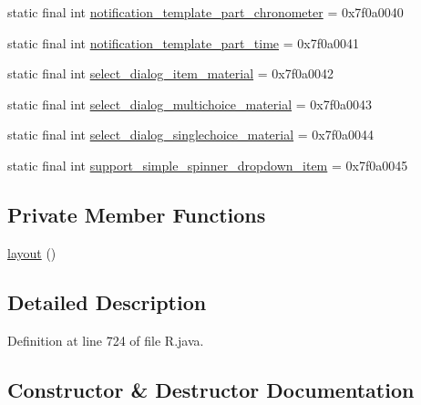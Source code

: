 \begin{DoxyCompactItemize}
\item 
static final int \mbox{\hyperlink{classandroid_1_1support_1_1v7_1_1appcompat_1_1_r_1_1layout_a40ec1f0c58d5ef14dcdabd2917b39098}{notification\+\_\+template\+\_\+part\+\_\+chronometer}} = 0x7f0a0040
\item 
static final int \mbox{\hyperlink{classandroid_1_1support_1_1v7_1_1appcompat_1_1_r_1_1layout_a45b077fa0a865191a582090d784b1163}{notification\+\_\+template\+\_\+part\+\_\+time}} = 0x7f0a0041
\item 
static final int \mbox{\hyperlink{classandroid_1_1support_1_1v7_1_1appcompat_1_1_r_1_1layout_ac19040d9099a5f9d5427814ac4a16e37}{select\+\_\+dialog\+\_\+item\+\_\+material}} = 0x7f0a0042
\item 
static final int \mbox{\hyperlink{classandroid_1_1support_1_1v7_1_1appcompat_1_1_r_1_1layout_adaf8230a8b0f528256d97c8817a7ea3c}{select\+\_\+dialog\+\_\+multichoice\+\_\+material}} = 0x7f0a0043
\item 
static final int \mbox{\hyperlink{classandroid_1_1support_1_1v7_1_1appcompat_1_1_r_1_1layout_a5310ca432c171907a158a12388549c4b}{select\+\_\+dialog\+\_\+singlechoice\+\_\+material}} = 0x7f0a0044
\item 
static final int \mbox{\hyperlink{classandroid_1_1support_1_1v7_1_1appcompat_1_1_r_1_1layout_ad5f037f06366e908921922a2df0a8133}{support\+\_\+simple\+\_\+spinner\+\_\+dropdown\+\_\+item}} = 0x7f0a0045
\end{DoxyCompactItemize}
\subsection*{Private Member Functions}
\begin{DoxyCompactItemize}
\item 
\mbox{\hyperlink{classandroid_1_1support_1_1v7_1_1appcompat_1_1_r_1_1layout_a8b1d60e1280e3683b0039725ef876f2f}{layout}} ()
\end{DoxyCompactItemize}


\subsection{Detailed Description}


Definition at line 724 of file R.\+java.



\subsection{Constructor \& Destructor Documentation}
\mbox{\label{classandroid_1_1support_1_1v7_1_1appcompat_1_1_r_1_1layout_a8b1d60e1280e3683b0039725ef876f2f}} 

